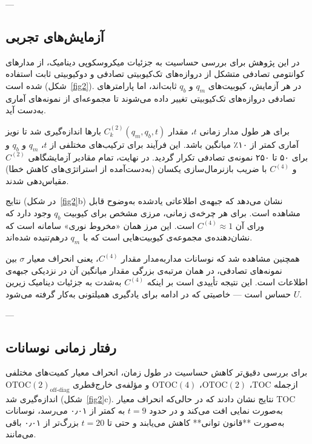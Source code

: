 ---

\subsection{آزمایش‌های تجربی}

در این پژوهش برای بررسی حساسیت  به جزئیات میکروسکوپی دینامیک، از مدارهای کوانتومی تصادفی متشکل از دروازه‌های تک‌کیوبیتی تصادفی و دوکیوبیتی ثابت استفاده شده است (شکل~\ref{fig2}).  
در هر آزمایش، کیوبیت‌های \( q_m \) و \( q_b \) ثابت‌اند، اما پارامترهای تصادفی دروازه‌های تک‌کیوبیتی تغییر داده می‌شوند تا مجموعه‌ای از نمونه‌های آماری به‌دست آید.

برای هر طول مدار زمانی \( t \)، مقدار \( C^{(2)}_k(q_m, q_b, t) \) بارها اندازه‌گیری شد تا نویز آماری کمتر از ۱۰٪ میانگین باشد.  
این فرآیند برای ترکیب‌های مختلفی از \( t \)، \( q_m \) و \( q_b \) و برای ۵۰ تا ۲۵۰ نمونه‌ی تصادفی تکرار گردید.  
در نهایت، تمام مقادیر آزمایشگاهی \( C^{(2)} \) و \( C^{(4)} \) با ضریب بازنرمال‌سازی یکسان (به‌دست‌آمده از استراتژی‌های کاهش خطا) مقیاس‌دهی شدند.

نتایج (در شکل~\ref{fig2}b) نشان می‌دهد که جبهه‌ی اطلاعاتی یادشده به‌وضوح قابل مشاهده است. برای هر چرخه‌ی زمانی، مرزی مشخص برای کیوبیت \( q_b \) وجود دارد که ورای آن \( C^{(4)} \approx 1 \) است. این مرز همان «مخروط نوری» سامانه است که نشان‌دهنده‌ی مجموعه‌ی کیوبیت‌هایی است که با \( q_m \) درهم‌تنیده شده‌اند.

همچنین مشاهده شد که نوسانات مدار‌به‌مدار مقدار \( C^{(4)} \)، یعنی انحراف معیار \(\sigma\) بین نمونه‌های تصادفی، در همان مرتبه‌ی بزرگی مقدار میانگین آن در نزدیکی جبهه‌ی اطلاعات است. این نتیجه تأییدی است بر اینکه \( C^{(4)} \) به‌شدت به جزئیات دینامیک زیرین \( U \) حساس است — خاصیتی که در ادامه برای یادگیری همیلتونی به‌کار گرفته می‌شود.

---

\subsection{رفتار زمانی نوسانات}

برای بررسی دقیق‌تر کاهش حساسیت در طول زمان، انحراف معیار کمیت‌های مختلفی ازجمله \(\mathrm{TOC}\)، \(\mathrm{OTOC(2)}\)، \(\mathrm{OTOC(4)}\) و مؤلفه‌ی خارج‌قطری \(\mathrm{OTOC(2)}_{\text{off-diag}}\) اندازه‌گیری شد (شکل~\ref{fig2}c).  
نتایج نشان دادند که در حالی‌که انحراف معیار TOC به‌صورت نمایی افت می‌کند و در حدود \(t = 9\) به کمتر از ۰٫۰۱ می‌رسد، نوسانات  به‌صورت **قانون توانی** کاهش می‌یابند و حتی تا \(t = 20\) بزرگ‌تر از ۰٫۰۱ باقی می‌مانند.

